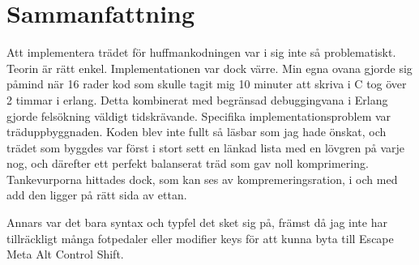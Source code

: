 \documentclass[a4paper, 11pt]{article}
\begin{document}
\section{Sammanfattning}

Att implementera trädet för huffmankodningen var i sig inte så problematiskt. Teorin är rätt enkel. Implementationen var dock värre. Min egna ovana gjorde sig påmind när 16 rader kod som skulle tagit mig 10 minuter att skriva i C tog över 2 timmar i erlang. Detta kombinerat med begränsad debuggingvana i Erlang gjorde felsökning väldigt tidskrävande. Specifika implementationsproblem var träduppbyggnaden. Koden blev inte fullt så läsbar som jag hade önskat, och trädet som byggdes var först i stort sett en länkad lista med en lövgren på varje nog, och därefter ett perfekt balanserat träd som gav noll komprimering. Tankevurporna hittades dock, som kan ses av kompremeringsration, i och med add den ligger på rätt sida av ettan.

Annars var det bara syntax och typfel det sket sig på, främst då jag inte har tillräckligt många fotpedaler eller modifier keys för att kunna byta till Escape Meta Alt Control Shift.
\end{document}
